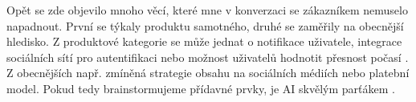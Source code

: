 \documentclass[FM,DP]{tulthesis}
\begin{document}
		Opět se zde objevilo mnoho věcí, které mne v konverzaci se zákazníkem nemuselo napadnout. První se týkaly produktu samotného, druhé se zaměřily na obecnější hledisko. Z produktové kategorie se může jednat o notifikace uživatele, integrace sociálních sítí pro autentifikaci nebo možnost uživatelů hodnotit přesnost počasí \cite{bard_analyza} \cite{chatgpt_analyza} \cite{codellama_analyza} \cite{gitCopilot_analyza} \cite{claude_analyza}. Z obecnějších např. zmíněná strategie obsahu na sociálních médiích nebo platební model. Pokud tedy brainstormujeme přídavné prvky, je AI skvělým parťákem \cite{bingCopilot_analyza} \cite{falcon_analyza}.
		
		
		
		
		
\end{document}
